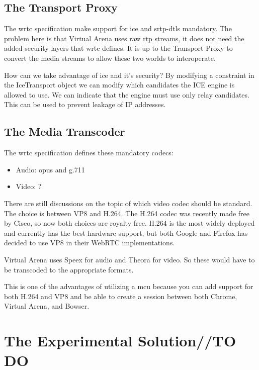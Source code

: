 \subsection{The Transport Proxy}
The \gls{wrtc} specification make support for \gls{ice} and \gls{srtp}-{dtls} mandatory. The problem here is that Virtual Arena uses raw \gls{rtp} streams, it does not need the added security layers that \gls{wrtc} defines. It is up to the Transport Proxy to convert the media streams to allow these two worlds to interoperate. 

How can we take advantage of \gls{ice} and it's security? By modifying a constraint in the IceTransport object we can modify which candidates the ICE engine is allowed to use. We can indicate that the engine must use only relay candidates. This can be used to prevent leakage of IP addresses.


\subsection{The Media Transcoder}
The \gls{wrtc} specification defines these mandatory codecs:
\begin{itemize}
    \item Audio: opus and g.711
    \item Video: ?
\end{itemize}

There are still discussions on the topic of which video codec should be standard. The choice is between VP8 and H.264. The H.264 codec was recently made free by Cisco, so now both choices are royalty free. H.264 is the most widely deployed and currently has the best hardware support, but both Google and Firefox has decided to use VP8 in their WebRTC implementations.

Virtual Arena uses Speex for audio and Theora for video. So these would have to be transcoded to the appropriate formats.

This is one of the advantages of utilizing a \gls{mcu} because you can add support for both H.264 and VP8 and be able to create a session between  both Chrome, Virtual Arena, and Bowser.


\section{The Experimental Solution//TO DO}

